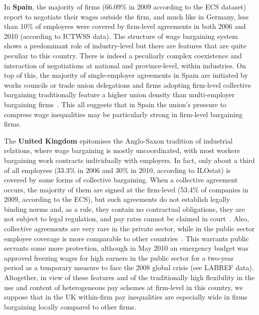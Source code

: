 \documentclass[12pt]{article}
\begin{document}
In \textbf{Spain}, the majority of firms (66.09\% in 2009 according to the ECS dataset) report to negotiate their wages outside the firm, and much like in Germany, less than 10\% of employees were covered by firm-level agreements in both 2006 and 2010 (according to ICTWSS data). The structure of wage bargaining system shows a predominant role of industry-level but there are features that are quite peculiar to this country. There is indeed a peculiarly complex coexistence and interaction of negotiations at national and province-level, within industries. On top of this, the majority of single-employer agreements in Spain are initiated by works
councils or trade union delegations and firms adopting firm-level collective bargaining traditionally feature a higher union density than multi-employer bargaining firms~\citep{plasman.rusinek.ea.2007}. This all suggests that in Spain the union's pressure to compress wage inequalities may be particularly strong in firm-level bargaining firms.


The \textbf{United Kingdom} epitomises the Anglo-Saxon tradition of industrial relations, where wage bargaining is mostly uncoordinated, with most workers bargaining work contracts individually with employers. In fact, only about a third of all employees (33.3\% in 2006 and 30\% in 2010, according to ILOstat) is covered by some forms of collective bargaining. When a collective agreement occurs, the majority of them are signed at the firm-level (53.4\% of companies in 2009, according to the ECS), but such agreements do not establish legally binding norms and, as a rule, they contain no contractual obligations, they are not subject to legal regulation, and pay rates cannot be claimed in court~\citep{visser2013wage}.
Also, collective agreements are very rare in the private sector, while in the public sector employee coverage is more comparable to other countries~\citep{fulton.2013}.
This warrants public servants some more protection, although in May 2010 an emergency budget was approved freezing wages for high earners in the public sector for a two-year period as a temporary measure to face the 2008 global crisis (see LABREF data). Altogether, in view of these features and of the traditionally high flexibility in the use and content of heterogeneous pay schemes at firm-level in this country, we suppose that in the UK within-firm pay inequalities are especially wide in firms bargaining locally compared to other firms.
\end{document}
